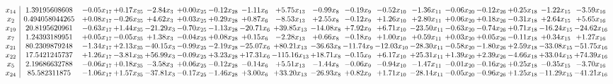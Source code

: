 \documentclass[9pt]{article}
\begin{document}
 \[\begin{array}{c| c c@{\hskip 2pt} c@{\hskip 2pt} c@{\hskip 2pt} c@{\hskip 2pt} c@{\hskip 2pt} c@{\hskip 2pt} c@{\hskip 2pt} c@{\hskip 2pt} c@{\hskip 2pt} c@{\hskip 2pt} c@{\hskip 2pt} c@{\hskip 2pt} c@{\hskip 2pt} c@{\hskip 2pt} c@{\hskip 2pt} c@{\hskip 2pt} }
 x_{14}   &  1.39195608608 & -0.05 x_{17} & +  0.17 x_{35} & -2.84 x_{3} & +  0.00 x_{25} & -0.12 x_{28} & -1.11 x_{6} & +  5.75 x_{13} & -0.99 x_{8} & -0.19 x_{9} & -0.52 x_{10} & -1.36 x_{11} & -0.06 x_{20} & -0.12 x_{26} & +  0.25 x_{18} & -1.22 x_{15} & -3.59 x_{16}\\
 x_{2}   &  0.494058044265 & +  0.08 x_{17} & -0.26 x_{35} & +  4.62 x_{3} & +  0.03 x_{25} & +  0.29 x_{28} & +  0.87 x_{6} & -8.53 x_{13} & +  2.55 x_{8} & -0.12 x_{9} & +  1.26 x_{10} & +  2.80 x_{11} & +  0.06 x_{20} & +  0.18 x_{26} & -0.31 x_{18} & +  2.64 x_{15} & +  5.65 x_{16}\\
 x_{19}   &  20.8195620961 & -0.63 x_{17} & +  1.44 x_{35} & -21.29 x_{3} & -0.70 x_{25} & -1.13 x_{28} & -20.71 x_{6} & + 39.85 x_{13} & -14.08 x_{8} & +  7.92 x_{9} & +  6.71 x_{10} & -23.50 x_{11} & -0.63 x_{20} & -0.74 x_{26} & +  0.71 x_{18} & -16.24 x_{15} & -24.62 x_{16}\\
 x_{7}   &  1.24393189951 & +  0.05 x_{17} & -0.05 x_{35} & +  1.38 x_{3} & -0.04 x_{25} & +  0.08 x_{28} & +  0.15 x_{6} & -2.28 x_{13} & +  0.66 x_{8} & -0.18 x_{9} & +  1.00 x_{10} & +  0.59 x_{11} & +  0.03 x_{20} & +  0.05 x_{26} & -0.11 x_{18} & +  0.34 x_{15} & +  1.27 x_{16}\\
 x_{21}   &  80.2309879248 & -1.34 x_{17} & +  2.13 x_{35} & -40.15 x_{3} & -0.99 x_{25} & -2.19 x_{28} & -25.07 x_{6} & + 80.21 x_{13} & -36.63 x_{8} & -11.74 x_{9} & -12.03 x_{10} & -28.30 x_{11} & -0.58 x_{20} & -1.80 x_{26} & +  2.59 x_{18} & -33.08 x_{15} & -51.75 x_{16}\\
 x_{22}   &  17.5421245737 & +  1.26 x_{17} & -3.81 x_{35} & + 56.99 x_{3} & -0.09 x_{25} & +  3.23 x_{28} & + 17.31 x_{6} & -115.16 x_{13} & + 18.71 x_{8} & -0.15 x_{9} & +  6.17 x_{10} & + 25.31 x_{11} & +  1.39 x_{20} & +  2.39 x_{26} & -4.66 x_{18} & + 33.04 x_{15} & + 74.39 x_{16}\\
 x_{5}   &  2.19686632788 & -0.06 x_{17} & +  0.18 x_{35} & -3.58 x_{3} & +  0.06 x_{25} & -0.12 x_{28} & -0.14 x_{6} & +  5.51 x_{13} & -1.44 x_{8} & -0.06 x_{9} & -0.94 x_{10} & -1.47 x_{11} & -0.01 x_{20} & -0.16 x_{26} & +  0.25 x_{18} & -0.35 x_{15} & -3.70 x_{16}\\
 x_{24}   &  85.582311875 & -1.06 x_{17} & +  1.57 x_{35} & -37.81 x_{3} & -0.17 x_{25} & -1.46 x_{28} & +  3.00 x_{6} & + 33.20 x_{13} & -26.93 x_{8} & +  0.82 x_{9} & +  1.71 x_{10} & -28.14 x_{11} & -0.05 x_{20} & -0.96 x_{26} & +  1.25 x_{18} & -11.29 x_{15} & -41.21 x_{16}\\

\end{array}\]
\end{document}
